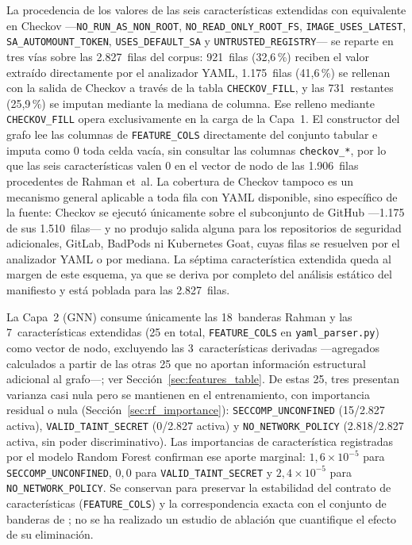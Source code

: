 La procedencia de los valores de las seis características extendidas con
equivalente en Checkov \citep{Checkov2021} —\texttt{NO\_RUN\_AS\_NON\_ROOT},
\texttt{NO\_READ\_ONLY\_ROOT\_FS}, \texttt{IMAGE\_USES\_LATEST},
\texttt{SA\_AUTOMOUNT\_TOKEN}, \texttt{USES\_DEFAULT\_SA} y
\texttt{UNTRUSTED\_REGISTRY}— se reparte en tres vías sobre las 2.827~filas del
corpus: 921~filas (32,6\,\%) reciben el valor extraído directamente por el
analizador \acs{YAML}, 1.175~filas (41,6\,\%) se rellenan con la salida de
Checkov a través de la tabla \texttt{CHECKOV\_FILL}, y las 731~restantes
(25,9\,\%) se imputan mediante la mediana de columna. Ese relleno mediante
\texttt{CHECKOV\_FILL} opera exclusivamente en la carga de la Capa~1. El constructor
del grafo lee las columnas de \texttt{FEATURE\_COLS} directamente del conjunto
tabular e imputa como 0 toda celda vacía, sin consultar las columnas
\texttt{checkov\_*}, por lo que las seis características valen 0 en el vector de
nodo de las 1.906~filas procedentes de Rahman et~al. La cobertura de
Checkov tampoco es un mecanismo general aplicable a toda fila con
\acs{YAML} disponible, sino específico de la fuente: Checkov se ejecutó únicamente sobre el subconjunto de
GitHub —1.175 de sus 1.510~filas— y no produjo salida alguna para los
repositorios de seguridad adicionales, GitLab, BadPods ni Kubernetes Goat, cuyas
filas se resuelven por el analizador \acs{YAML} o por mediana. La séptima
característica extendida queda al margen de este esquema, ya que
 se deriva por completo del análisis estático del
manifiesto y está poblada para las 2.827~filas.

La Capa~2 (\ac{GNN}) consume únicamente las 18~banderas Rahman y las 7~características extendidas
(25 en total, \texttt{FEATURE\_COLS} en \texttt{yaml\_parser.py}) como vector de nodo,
excluyendo las 3~características derivadas —agregados calculados a partir de las otras 25 que
no aportan información estructural adicional al grafo\mbox{—;} ver
Sección~\ref{sec:features_table}. De estas 25, tres presentan varianza casi nula pero
se mantienen en el entrenamiento, con importancia residual o nula
(Sección~\ref{sec:rf_importance}): \texttt{SECCOMP\_UNCONFINED} (15/2.827 activa),
\texttt{VALID\_TAINT\_SECRET} (0/2.827 activa) y \texttt{NO\_NETWORK\_POLICY}
(2.818/2.827 activa, sin poder discriminativo). Las importancias de característica
registradas por el modelo Random Forest confirman ese aporte marginal:
\(1{,}6\times10^{-5}\) para \texttt{SECCOMP\_UNCONFINED}, \(0{,}0\) para
\texttt{VALID\_TAINT\_SECRET} y \(2{,}4\times10^{-5}\) para
\texttt{NO\_NETWORK\_POLICY}. Se conservan para preservar la estabilidad del
contrato de características (\texttt{FEATURE\_COLS}) y la correspondencia exacta
con el conjunto de banderas de \citet{Rahman2022}; no se ha realizado
un estudio de ablación que cuantifique el efecto de su eliminación.

